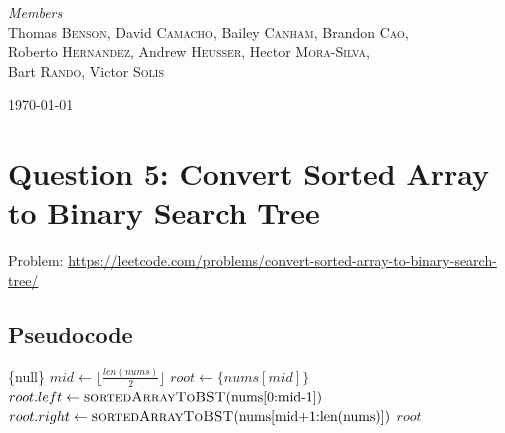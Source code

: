 \documentclass[11pt]{article}
\begin{document}
\begin{titlepage}
	{\large\textit{Members}}\\
	Thomas \textsc{Benson},
	David \textsc{Camacho},
	Bailey \textsc{Canham},
	Brandon \textsc{Cao},\\
	Roberto \textsc{Hernandez},
	Andrew \textsc{Heusser},
    Hector \textsc{Mora-Silva},\\
	Bart \textsc{Rando},
	Victor \textsc{Solis}

	\vfill\vfill\vfill 
	{\large\today} 

	\vfill 

\end{titlepage}


\tableofcontents
\newpage


\section{Question 5: Convert Sorted Array to Binary Search Tree}
Problem: \url{https://leetcode.com/problems/convert-sorted-array-to-binary-search-tree/}

\subsection{Pseudocode}


\begin{algorithm}[H]
    \begin{algorithmic}
                \State \Return \{null\}
            \EndIf
            \State $mid \gets \lfloor \frac{len(nums)}{2} \rfloor$
            \State $root \gets \{nums[mid]\}$
            \State $root.left \gets \Call{sortedArrayToBST}{$nums[0:mid-1]$}$
            \State $root.right \gets \Call{sortedArrayToBST}{$nums[mid+1:len(nums)]$}$
            \State \Return $root$
        \EndFunction
    \end{algorithmic}
\end{algorithm}
\end{document}
